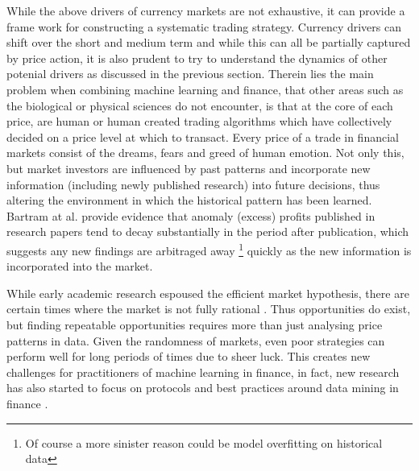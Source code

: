 \documentclass[11pt, a4paper]{article}
\begin{document}
While the above drivers of currency markets are not exhaustive, it can provide a frame work for constructing a systematic trading strategy. Currency drivers can shift over the short and medium term and while this can all be partially captured by price action, it is also prudent to try to understand the dynamics of other potenial drivers as discussed in the previous section. \newline
Therein lies the main problem when combining machine learning and finance, that other areas such as the biological or physical sciences do not encounter, is that at the core of each price, are human or human created trading algorithms which have collectively decided on a price level at which to transact. \newline Every price of a trade in financial markets consist of the dreams, fears and greed of human emotion. Not only this, but market investors are influenced by past patterns and incorporate new information (including newly published research) into future decisions, thus altering the environment in which the historical pattern has been learned. Bartram at al. provide evidence that anomaly (excess) profits published in research papers tend to decay substantially in the period after publication, which suggests any new findings are arbitraged away \footnote{Of course a more sinister reason could be model overfitting on historical data} quickly as the new information is incorporated into the market\cite{Bartram2019}. 

While early academic research espoused the efficient market hypothesis, there are certain times where the market is not fully rational \cite{Dome2008}. Thus opportunities do exist, but finding repeatable opportunities requires more than just analysing price patterns in data. Given the randomness of markets, even poor strategies can perform well for long periods of times due to sheer luck. This creates new challenges for practitioners of machine learning in finance, in fact, new research has also started to focus on protocols and best practices around data mining in finance \cite{Arnott2018}.
\end{document}
